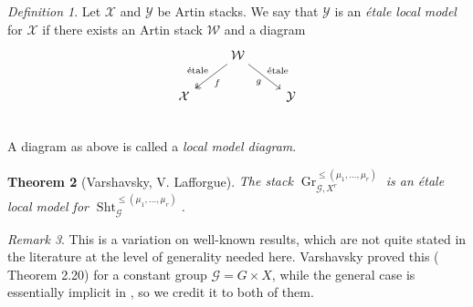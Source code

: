 \documentclass[reqno]{amsart}
\numberwithin{equation}{section}
\newcommand{\Cal}[1]{\mathcal{#1}}
\DeclareMathOperator{\Gr}{Gr}
\DeclareMathOperator{\Sht}{Sht}
\newtheorem{thm}{Theorem}[section]
\theoremstyle{remark}
\newtheorem{remark}[thm]{Remark}
\newtheorem{defn}[thm]{Definition}
\numberwithin{equation}{section}
\begin{document}
\begin{defn}
Let $\Cal{X}$ and $\Cal{Y}$ be Artin stacks. We say that $\Cal{Y}$ is an \emph{\'{e}tale local model} for $\Cal{X}$ if there exists an Artin stack $\Cal{W}$ and a diagram
\[
\begin{tikzcd}
& \Cal{W} \ar[dl, twoheadrightarrow, "\text{\'{e}tale}"', "f"] \ar[dr, "\text{\'{e}tale}", "g"']  \\
\Cal{X} & & \Cal{Y} \\
\end{tikzcd}
\]
A diagram as above is called a \emph{local model diagram}.
\end{defn}





\begin{thm}[Varshavsky, V. Lafforgue] \label{varshavsky local model}
The stack $\Gr_{\Cal{G}, X^r}^{\leq (\mu_1, \ldots, \mu_r)} $ is an \'{e}tale local model for $\Sht_{\Cal{G}}^{ \leq (\mu_1, \ldots, \mu_r)}$. 
\end{thm}

\begin{remark}
This is a variation on well-known results, which are not quite stated in the literature at the level of generality needed here. Varshavsky proved  this (\cite{Var04} Theorem 2.20)  for a constant group $\Cal{G} = G \times X$, while the general case is essentially implicit in \cite{Laff12}, so we credit it to both of them. 
\end{remark}
\end{document}
